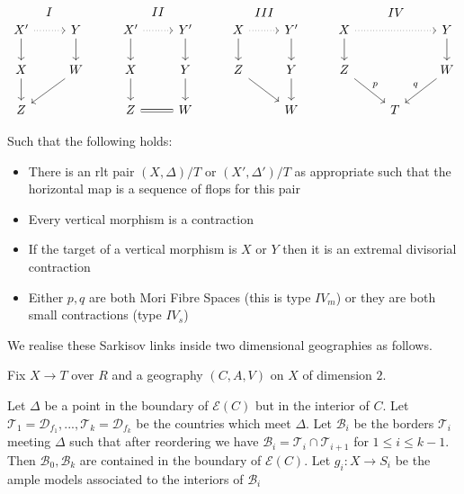 \documentclass[a4paper,12pt]{amsart}
\begin{document}
\[\begin{tikzcd}
X' \arrow[d] \arrow[r, dotted] \arrow[r, "I", phantom, bend left=49] & Y \arrow[d]  & X' \arrow[r, dotted] \arrow[d] \arrow[r, "II",phantom, bend left=49] & Y' \arrow[d] & X \arrow[r, dotted] \arrow[d] \arrow[r, "III", phantom, bend left=49] & Y' \arrow[d] & X \arrow[d] \arrow[rr, dotted] \arrow[rr, "IV",phantom, bend left] &   & Y \arrow[d]       \\
X \arrow[d]                                                          & W \arrow[ld] & X \arrow[d]                                               & Y \arrow[d]  & Z \arrow[rd]                                              & Y \arrow[d]  & Z \arrow[rd, "p"]                                          &   & W \arrow[ld, "q"'] \\
Z                                                                    &              & Z \arrow[r, equal]                                                         & W            &                                                           & W            &                                                            & T &                  
\end{tikzcd} \]


Such that the following holds:
\begin{itemize}
	\item There is an rlt pair $(X,\Delta)/T$ or $(X',\Delta')/T$ as appropriate such that the horizontal map is a sequence of flops for this pair
	\item Every vertical morphism is a contraction
	\item If the target of a vertical morphism is $X$ or $Y$ then it is an extremal divisorial contraction
	\item Either $p,q$ are both Mori Fibre Spaces (this is type $IV_{m}$) or they are both small contractions (type $IV_{s}$)
\end{itemize}

We realise these Sarkisov links inside two dimensional geographies as follows.

Fix $X\to T$ over $R$ and a geography $(C,A,V)$ on $X$ of dimension $2$.

Let $\Delta$ be a point in the boundary of $\mathcal{E}(C)$ but in the interior of $C$. Let $\mathcal{T}_{1}=\mathcal{D}_{f_{1}},..., \mathcal{T}_{k}=\mathcal{D}_{f_{k}}$ be the countries which meet $\Delta$. Let $\mathcal{B}_{i}$ be the borders $\mathcal{T}_{i}$ meeting $\Delta$ such that after reordering we have $\mathcal{B}_{i}=\mathcal{T}_{i}\cap \mathcal{T}_{i+1}$ for $1 \leq i \leq k-1$. Then $\mathcal{B}_{0}, \mathcal{B}_{k}$ are contained in the boundary of $\mathcal{E}(C)$. Let $g_{i}:X \to S_{i}$ be the ample models associated to the interiors of $\mathcal{B}_{i}$
\end{document}
